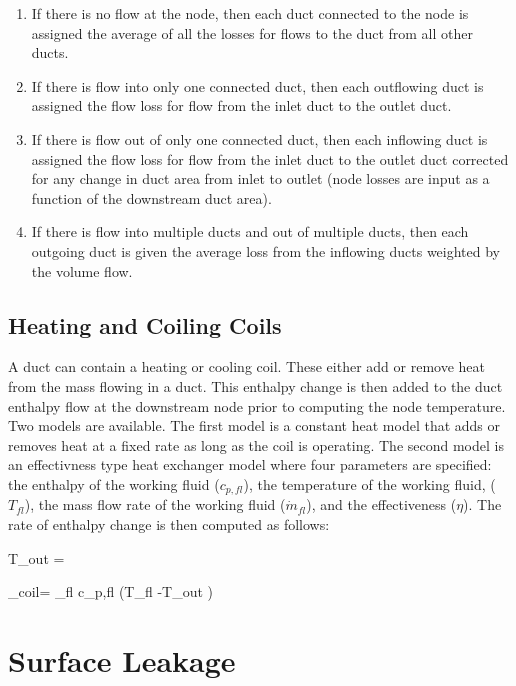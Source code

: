 \begin{enumerate}
\item If there is no flow at the node, then each duct connected to the node is assigned the average of all the losses for flows to the duct from all other ducts. 
\item If there is flow into only one connected duct, then each outflowing duct is assigned the flow loss for flow from the inlet duct to the outlet duct.
\item If there is flow out of only one connected duct, then each inflowing duct is assigned the flow loss for flow from the inlet duct to the outlet duct corrected for any change in duct area from inlet to outlet (node losses are input as a function of the downstream duct area).
\item If there is flow into multiple ducts and out of multiple ducts, then each outgoing duct is given the average loss from the inflowing ducts weighted by the volume flow.
\end{enumerate}

\subsection{Heating and Coiling Coils}

A duct can contain a heating or cooling coil.  These either add or remove heat from the mass flowing in a duct.  This enthalpy change is then added to the duct enthalpy flow at the downstream node prior to computing the node temperature.  Two models are available.  The first model is a constant heat model that adds or removes heat at a fixed rate as long as the coil is operating.  The second model is an effectivness type heat exchanger model where four parameters are specified: the enthalpy of the working fluid ($c_{p,fl}$), the temperature of the working fluid, ($T_{fl}$), the mass flow rate of the working fluid ($\dot{m}_{fl}$), and the effectiveness ($\eta$).  The rate of enthalpy change is then computed as follows:

\be T_{out} =  \ee

\be {}_{coil}= _{fl} c_{p,fl} \left(T_{fl} -T_{out} \right) \eta \ee

\section{Surface Leakage}


